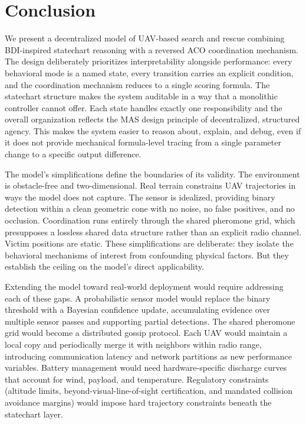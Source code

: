 \documentclass[10pt,a4paper,twocolumn]{article}
\begin{document}
\lipsum[1-2]

\lipsum[3-4]

\lipsum[5-6]

\section{Conclusion}

We present a decentralized model of UAV-based search and rescue combining BDI-inspired statechart reasoning with a reversed ACO coordination mechanism. The design deliberately prioritizes interpretability alongside performance: every behavioral mode is a named state, every transition carries an explicit condition, and the coordination mechanism reduces to a single scoring formula. The statechart structure makes the system auditable in a way that a monolithic controller cannot offer. Each state handles exactly one responsibility and the overall organization reflects the MAS design principle of decentralized, structured agency. This makes the system easier to reason about, explain, and debug, even if it does not provide mechanical formula-level tracing from a single parameter change to a specific output difference.

\lipsum[7]

The model's simplifications define the boundaries of its validity. The environment is obstacle-free and two-dimensional. Real terrain constrains UAV trajectories in ways the model does not capture. The sensor is idealized, providing binary detection within a clean geometric cone with no noise, no false positives, and no occlusion. Coordination runs entirely through the shared pheromone grid, which presupposes a lossless shared data structure rather than an explicit radio channel. Victim positions are static. These simplifications are deliberate: they isolate the behavioral mechanisms of interest from confounding physical factors. But they establish the ceiling on the model's direct applicability.

Extending the model toward real-world deployment would require addressing each of these gaps. A probabilistic sensor model would replace the binary threshold with a Bayesian confidence update, accumulating evidence over multiple sensor passes and supporting partial detections. The shared pheromone grid would become a distributed gossip protocol. Each UAV would maintain a local copy and periodically merge it with neighbors within radio range, introducing communication latency and network partitions as new performance variables. Battery management would need hardware-specific discharge curves that account for wind, payload, and temperature. Regulatory constraints (altitude limits, beyond-visual-line-of-sight certification, and mandated collision avoidance margins) would impose hard trajectory constraints beneath the statechart layer.
\end{document}
